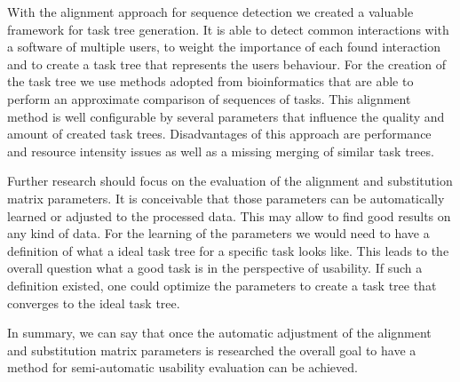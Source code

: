 With the alignment approach for sequence detection we created a valuable framework for task tree generation. 
It is able to detect common interactions with a software of multiple users, to weight the importance of each found interaction and to create a task tree that represents
the users behaviour.
For the creation of the task tree we use methods adopted from bioinformatics that are able to perform an approximate comparison of sequences of tasks. 
This alignment method is well configurable by several parameters that influence the quality and amount of created task trees.
Disadvantages of this approach are performance and resource intensity issues as well as a missing merging of similar task trees.

Further research should focus on the evaluation of the alignment and substitution matrix parameters. 
It is conceivable that those parameters can be automatically learned or adjusted to the processed data.
This may allow to find good results on any kind of data. 
For the learning of the parameters we would need to have a definition of what a ideal task tree for a specific task looks like.
This leads to the overall question what a good task is in the perspective of usability.
If such a definition existed, one could optimize the parameters to create a task tree that converges to the ideal task tree.

In summary, we can say that once the automatic adjustment of the alignment and substitution matrix parameters is researched the overall goal to have a method for semi-automatic usability evaluation can be achieved.




